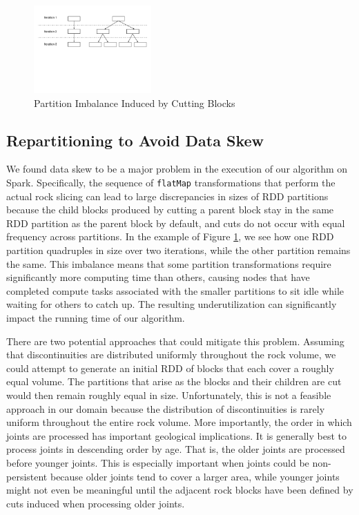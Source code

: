 \begin{figure}[h]
\centering
\includegraphics[width=0.4\textwidth]{flatMap.pdf}
\caption{Partition Imbalance Induced by Cutting Blocks}
\label{fig:flatMap}
\end{figure}

\subsection{Repartitioning to Avoid Data Skew}
We found data skew to be a major problem in the execution of our algorithm on Spark. Specifically, the sequence of \texttt{flatMap} transformations that perform the actual rock slicing can lead to large discrepancies in sizes of RDD partitions because the child blocks produced by cutting a parent block stay in the same RDD partition as the parent block by default, and cuts do not occur with equal frequency across partitions. In the example of Figure \ref{fig:flatMap}, we see how one RDD partition quadruples in size over two iterations, while the other partition remains the same. This imbalance means that some partition transformations require significantly more computing time than others, causing nodes that have completed compute tasks associated with the smaller partitions to sit idle while waiting for others to catch up. The resulting underutilization can significantly impact the running time of our algorithm.

There are two potential approaches that could mitigate this problem. Assuming that discontinuities are distributed uniformly throughout the rock volume, we could attempt to generate an initial RDD of blocks that each cover a roughly equal volume. The partitions that arise as the blocks and their children are cut would then remain roughly equal in size. Unfortunately, this is not a feasible approach in our domain because the distribution of discontinuities is rarely uniform throughout the entire rock volume. More importantly, the order in which joints are processed has important geological implications. It is generally best to process joints in descending order by age. That is, the older joints are processed before younger joints. This is especially important when joints could be non-persistent because older joints tend to cover a larger area, while younger joints might not even be meaningful until the adjacent rock blocks have been defined by cuts induced when processing older joints.

